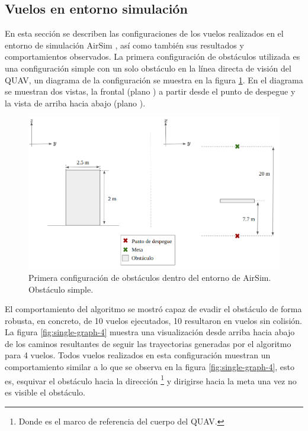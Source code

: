 \label{sec:results-flights}

\subsection{Vuelos en entorno simulación}

\label{sec:results-AirSim}

En esta sección se describen las configuraciones de los vuelos realizados en el entorno de simulación AirSim \cite{shah2018airsim}, así como también sus resultados y comportamientos observados. La primera configuración de obstáculos utilizada es una configuración simple con un solo obstáculo en la línea directa de visión del QUAV, un diagrama de la configuración se muestra en la figura \ref{fig:config-1-single}. En el diagrama se muestran dos vistas, la frontal (plano ) a partir desde el punto de despegue y la vista de arriba hacia abajo (plano ).

\begin{figure}[H]
    \centering
    \includegraphics[scale=0.35]{partes/img/config-1-single.png}
    \caption[Primera configuración de obstáculos dentro del entorno de AirSim.]{Primera configuración de obstáculos dentro del entorno de AirSim. Obstáculo simple.}
    \label{fig:config-1-single}
\end{figure}

El comportamiento del algoritmo se mostró capaz de evadir el obstáculo de forma robusta, en concreto, de 10 vuelos ejecutados, 10 resultaron en vuelos sin colisión. La figura \ref{fig:single-graph-4} muestra una visualización desde arriba hacia abajo de los caminos resultantes de seguir las trayectorias generadas por el algoritmo para 4 vuelos. Todos vuelos realizados en esta configuración muestran un comportamiento similar a lo que se observa en la figura \ref{fig:single-graph-4}, esto es, esquivar el obstáculo hacia la dirección \footnote[1]{Donde  es el marco de referencia del cuerpo del QUAV.} y dirigirse hacia la meta una vez no es visible el obstáculo.

